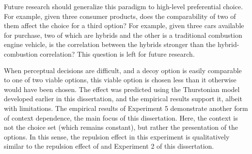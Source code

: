 Future research should generalize this paradigm to high-level preferential choice. For example, given three consumer products, does the comparability of two of them affect the choice for a third option? For example, given three cars available for purchase, two of which are hybrids and the other is a traditional combustion engine vehicle, is the correlation between the hybrids stronger than the hybrid-combustion correlation? This question is left for future research.

When perceptual decisions are difficult, and a decoy option is easily comparable to one of two viable options, this viable option is chosen less than it otherwise would have been chosen. The effect was predicted using the Thurstonian model developed earlier in this dissertation, and the empirical results support it, albeit with limitations.  The empirical results of Experiment 5 demonstrate another form of context dependence, the main focus of this dissertation. Here, the context is not the choice set (which remains constant), but rather the presentation of the options. In this sense, the repulsion effect in this experiment is qualitatively similar to the repulsion effect of \textcite{spektorWhenGoodLooks2018b} and Experiment 2 of this dissertation.
